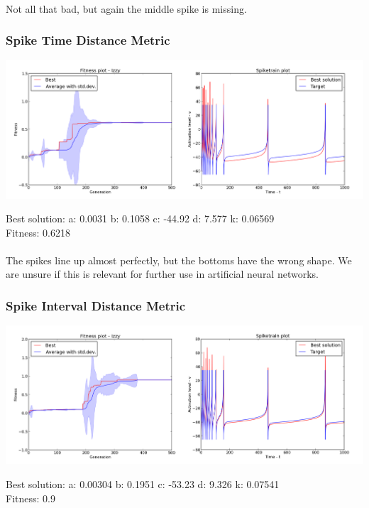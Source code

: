\documentclass[a4paper,12pt]{article}
\begin{document}
\paragraph{}Not all that bad, but again the middle spike is missing.

\subsubsection{Spike Time Distance Metric}
\centerline{\includegraphics[width=1.3\textwidth]{img/case4_time}}
Best solution: 
a: 0.0031 
b: 0.1058 
c: -44.92 
d: 7.577 
k: 0.06569 \\
Fitness: 0.6218
\paragraph{}The spikes line up almost perfectly, but the bottoms have the wrong shape. We are unsure if this is relevant for further use in artificial neural networks.

\subsubsection{Spike Interval Distance Metric}
\centerline{\includegraphics[width=1.3\textwidth]{img/case4_int}}
Best solution: 
a: 0.00304 
b: 0.1951 
c: -53.23 
d: 9.326 
k: 0.07541 \\
Fitness: 0.9
\end{document}
